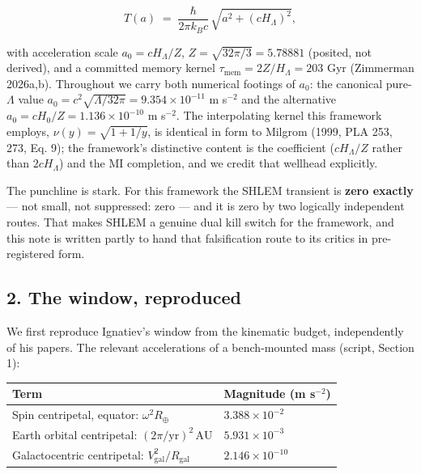 \documentclass[
]{article}
\newcounter{none} %
\begin{document}
\[T(a) \;=\; \frac{\hbar}{2\pi k_B c}\,\sqrt{a^2 + (cH_\Lambda)^2},\]

with acceleration scale \(a_0 = cH_\Lambda/Z\),
\(Z = \sqrt{32\pi/3} = 5.78881\) (posited, not derived), and a committed
memory kernel \(\tau_\mathrm{mem} = 2Z/H_\Lambda = 203\) Gyr (Zimmerman
2026a,b). Throughout we carry both numerical footings of \(a_0\): the
canonical pure-\(\Lambda\) value
\(a_0 = c^2\sqrt{\Lambda/32\pi} = 9.354\times10^{-11}\) m s\(^{-2}\) and
the alternative \(a_0 = cH_0/Z = 1.136\times10^{-10}\) m s\(^{-2}\). The
interpolating kernel this framework employs, \(\nu(y) = \sqrt{1+1/y}\),
is identical in form to Milgrom (1999, PLA 253, 273, Eq. 9); the
framework's distinctive content is the coefficient (\(cH_\Lambda/Z\)
rather than \(2cH_\Lambda\)) and the MI completion, and we credit that
wellhead explicitly.

The punchline is stark. For this framework the SHLEM transient is
\textbf{zero exactly} --- not small, not suppressed: zero --- and it is
zero by two logically independent routes. That makes SHLEM a genuine
dual kill switch for the framework, and this note is written partly to
hand that falsification route to its critics in pre-registered form.

\subsection{2. The window, reproduced}\label{the-window-reproduced}

We first reproduce Ignatiev's window from the kinematic budget,
independently of his papers. The relevant accelerations of a
bench-mounted mass (script, Section 1):

{\def\LTcaptype{none} %
\begin{longtable}[]{@{}
  >{\raggedright\arraybackslash}p{}
  >{\raggedright\arraybackslash}p{}@{}}
\toprule\noalign{}
\begin{minipage}[b]{\linewidth}\raggedright
Term
\end{minipage} & \begin{minipage}[b]{\linewidth}\raggedright
Magnitude (m s\(^{-2}\))
\end{minipage} \\
\midrule\noalign{}
\endhead
\bottomrule\noalign{}
\endlastfoot
Spin centripetal, equator: \(\omega^2 R_\oplus\) &
\(3.388\times10^{-2}\) \\
Earth orbital centripetal: \((2\pi/\mathrm{yr})^2\,\mathrm{AU}\) &
\(5.931\times10^{-3}\) \\
Galactocentric centripetal: \(V_\mathrm{gal}^2/R_\mathrm{gal}\) &
\(2.146\times10^{-10}\) \\
\end{longtable}
}
\end{document}
